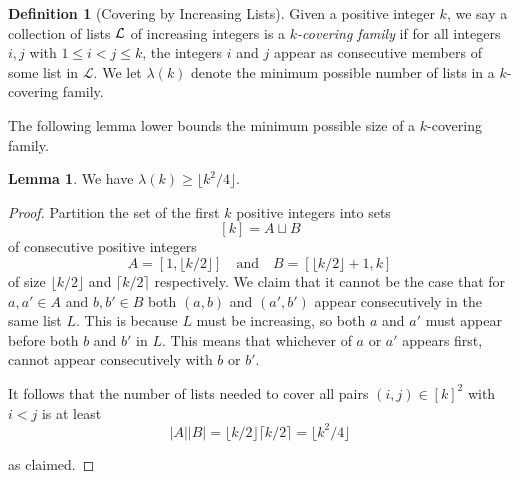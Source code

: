 \documentclass[11pt]{article}
\theoremstyle{definition}
\newtheorem{lemma}[theorem]{Lemma}
\newtheorem{definition}[theorem]{Definition}
\begin{document}

\begin{definition}[Covering by Increasing Lists]
    Given a positive integer $k$, we say a collection of lists $\cal{L}$ of increasing integers is a \emph{$k$-covering family} if for all integers $i,j$ with $1\le i<j \le k$, the integers $i$ and $j$ appear as consecutive members of some list in $\mathcal{L}$.
    We let $\lambda(k)$ denote the minimum possible number of lists in a $k$-covering family.
\end{definition}


The following lemma lower bounds the minimum possible size of a $k$-covering family. 

\begin{lemma}
    \label{lem:atleast-list}
        We have $\lambda(k)\ge \lfloor k^2/4\rfloor$.
\end{lemma}
\begin{proof}
Partition the set of the first $k$ positive integers into sets 
    \[[k] = A\sqcup B\]
of consecutive positive integers 
    \[A = [1, \lfloor k/2\rfloor] \quad \text{and}\quad B = [\lfloor k/2\rfloor + 1, k]\]
of size $\lfloor k/2 \rfloor$ and $\lceil k/2 \rceil$ respectively. 
We claim that it cannot be the case that for $a,a'\in A$ and $b,b'\in B$ both $(a,b)$ and $(a',b')$ appear consecutively in the same list $L$. 
This is because $L$ must be increasing, so both $a$ and $a'$ must appear before both $b$ and $b'$ in $L$. 
This means that whichever of $a$ or $a'$ appears first, cannot appear consecutively with $b$ or $b'$.

It follows that the number of lists needed to cover all pairs $(i,j)\in [k]^2$ with $i<j$ is at least 
    \[|A||B| = \lfloor k/2\rfloor\lceil k/2\rceil = \lfloor k^2/4\rfloor\]
    
    as claimed.
\end{proof}
\end{document}

